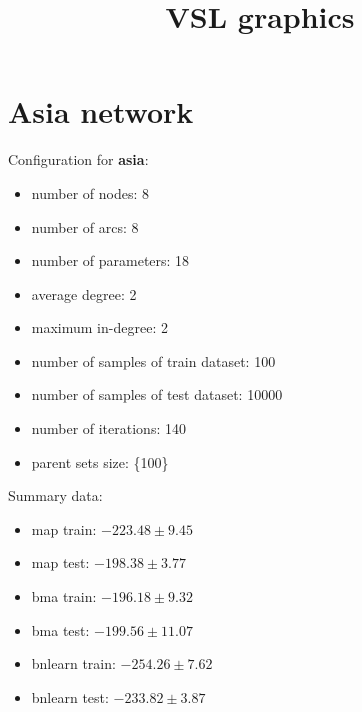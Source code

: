 \documentclass[]{scrartcl}
\title{VSL graphics}
\author{}
\begin{document}
\maketitle

\begin{abstract}

\end{abstract}

\section{Asia network}

Configuration for \textbf{asia}:

\begin{itemize}
\item number of nodes: 8
\item number of arcs: 8
\item number of parameters: 18
\item average degree: 2
\item maximum in-degree: 2
\item number of samples of train dataset: 100
\item number of samples of test dataset: 10000
\item number of iterations: 140
\item parent sets size: \{100\}
\end{itemize}

Summary data:

\begin{itemize}
\item map train:  $-223.48  \pm  9.45$
\item map test:  $-198.38  \pm  3.77$
\item bma train:  $-196.18  \pm  9.32$
\item bma test:  $-199.56  \pm  11.07$
\item bnlearn train:  $-254.26  \pm  7.62$
\item bnlearn test:  $-233.82  \pm  3.87$
\end{itemize}
\end{document}
